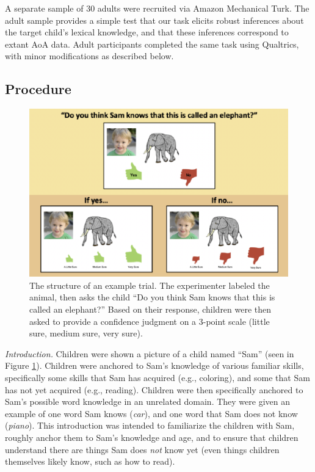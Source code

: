 \documentclass[10pt, letterpaper]{article}
\newenvironment{CodeChunk}{}{}
\begin{document}
A separate sample of 30 adults were recruited via Amazon Mechanical
Turk. The adult sample provides a simple test that our task elicits
robust inferences about the target child's lexical knowledge, and that
these inferences correspond to extant AoA data. Adult participants
completed the same task using Qualtrics, with minor modifications as
described below.

\hypertarget{procedure}{%
\subsection{Procedure}\label{procedure}}

\begin{CodeChunk}
\begin{figure}[tb]

{\centering \includegraphics{figs/task-method-1} 

}

\caption[The structure of an example trial]{The structure of an example trial. The experimenter labeled the animal, then asks the child “Do you think Sam knows that this is called an elephant?” Based on their response, children were then asked to provide a confidence judgment on a 3-point scale (little sure, medium sure, very sure).}\label{fig:task-method}
\end{figure}
\end{CodeChunk}

\emph{Introduction.} Children were shown a picture of a child named
``Sam'' (seen in Figure \ref{fig:task-method}). Children were anchored
to Sam's knowledge of various familiar skills, specifically some skills
that Sam has acquired (e.g., coloring), and some that Sam has not yet
acquired (e.g., reading). Children were then specifically anchored to
Sam's possible word knowledge in an unrelated domain. They were given an
example of one word Sam knows (\emph{car}), and one word that Sam does
not know (\emph{piano}). This introduction was intended to familiarize
the children with Sam, roughly anchor them to Sam's knowledge and age,
and to ensure that children understand there are things Sam does
\emph{not} know yet (even things children themselves likely know, such
as how to read).
\end{document}
